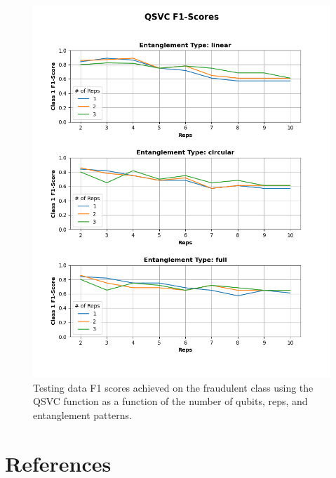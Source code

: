 \documentclass[11pt, oneside]{article}   	%
\begin{document}
\begin{figure}[h!]
    \centering
    \includegraphics[width=1.0\textwidth]{figures/fig_13.png}
    \captionsetup{font=small} 
    \caption{Testing data F1 scores achieved on the fraudulent class using the QSVC function as a function of the number of qubits, reps, and entanglement patterns.}
    \label{fig13}
\end{figure}

\newpage

\section{References}
\end{document}
